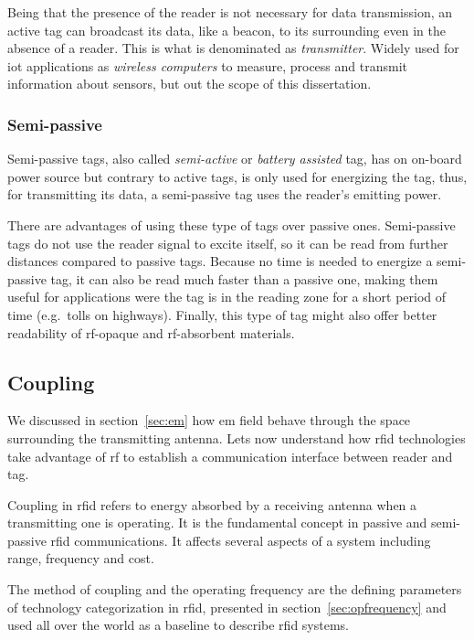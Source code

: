Being that the presence of the reader is not necessary for data transmission, an active tag can broadcast its data, like a beacon, to its surrounding even in the absence of a reader. This is what is denominated as \emph{transmitter}.
Widely used for \ac{iot} applications as \textit{wireless computers} to measure, process and transmit information about sensors, but out the scope of this dissertation.

\subsubsection{Semi-passive}

Semi-passive tags, also called \emph{semi-active} or \emph{battery assisted} tag, has on on-board power source but contrary to active tags, is only used for energizing the tag, thus, for transmitting its data, a semi-passive tag uses the reader's emitting power.

There are advantages of using these type of tags over passive ones.
Semi-passive tags do not use the reader signal to excite itself, so it can be read from further distances compared to passive tags. Because no time is needed to energize a semi-passive tag, it can also be read much faster than a passive one, making them useful for applications were the tag is in the reading zone for a short period of time (e.g.\ tolls on highways). Finally, this type of tag might also offer better readability of \ac{rf}-opaque and \ac{rf}-absorbent materials.

\subsection{Coupling}


We discussed in section~\ref{sec:em} how \acl{em} field behave through the space surrounding the transmitting antenna. Lets now understand how \ac{rfid} technologies take advantage of \acl{rf} to establish a communication interface between reader and tag.

Coupling in \ac{rfid} refers to energy absorbed by a receiving antenna when a transmitting one is operating. 
It is the fundamental concept in passive and semi-passive \ac{rfid} communications.
It affects several aspects of a system including range, frequency and cost.

The method of coupling and the operating frequency are the defining parameters of technology categorization in \ac{rfid}, presented in section~\ref{sec:opfrequency} and used all over the world as a baseline to describe \ac{rfid} systems.

